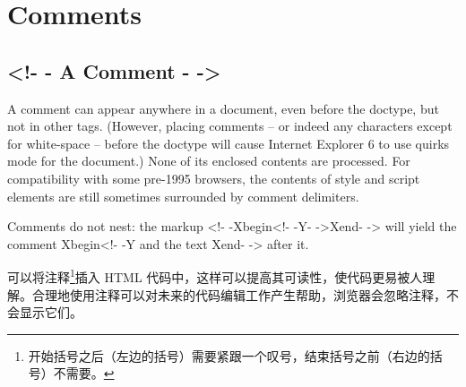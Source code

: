 \chapter{Comments}


\section{<!- - A Comment - ->}

A comment can appear anywhere in a document, even before the doctype, but not in other tags. (However, placing comments – or indeed any characters except for white-space – before the doctype will cause Internet Explorer 6 to use quirks mode for the document.) None of its enclosed contents are processed. For compatibility with some pre-1995 browsers, the contents of style and script elements are still sometimes surrounded by comment delimiters.

Comments do not nest: the markup <!- -Xbegin<!- -Y- ->Xend- -> will yield the comment Xbegin<!- -Y and the text Xend- -> after it.

可以将注释\footnote{开始括号之后（左边的括号）需要紧跟一个叹号，结束括号之前（右边的括号）不需要。}插入 HTML 代码中，这样可以提高其可读性，使代码更易被人理解。合理地使用注释可以对未来的代码编辑工作产生帮助，浏览器会忽略注释，不会显示它们。




































